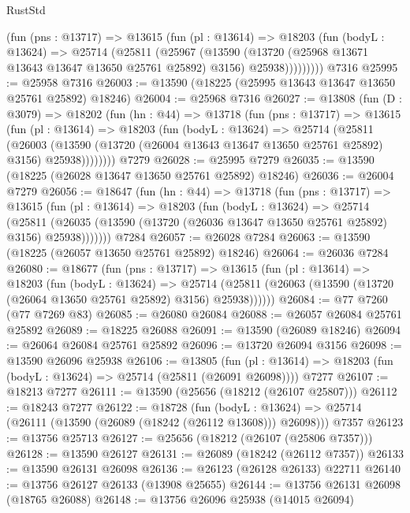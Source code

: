 \begin{lexlean}{RustStd}
\begin{coremodule}
          (fun (pns : @13717) =>
          @13615
            (fun (pl : @13614) =>
            @18203
              (fun (bodyL : @13624) =>
              @25714
                (@25811
                  (@25967
                    (@13590
                      (@13720 (@25968 @13671 @13643 @13647 @13650 @25761 @25892) @3156)
                      @25938)))))))))
    @7316
@25995 := @25958 @7316
@26003 := @13590 (@18225 (@25995 @13643 @13647 @13650 @25761 @25892) @18246)
@26004 := @25968 @7316
@26027 := @13808
    (fun (D : @3079) =>
    @18202
      (fun (hn : @44) =>
      @13718
        (fun (pns : @13717) =>
        @13615
          (fun (pl : @13614) =>
          @18203
            (fun (bodyL : @13624) =>
            @25714
              (@25811
                (@26003
                  (@13590 (@13720 (@26004 @13643 @13647 @13650 @25761 @25892) @3156) @25938))))))))
    @7279
@26028 := @25995 @7279
@26035 := @13590 (@18225 (@26028 @13647 @13650 @25761 @25892) @18246)
@26036 := @26004 @7279
@26056 := @18647
    (fun (hn : @44) =>
    @13718
      (fun (pns : @13717) =>
      @13615
        (fun (pl : @13614) =>
        @18203
          (fun (bodyL : @13624) =>
          @25714
            (@25811
              (@26035 (@13590 (@13720 (@26036 @13647 @13650 @25761 @25892) @3156) @25938)))))))
    @7284
@26057 := @26028 @7284
@26063 := @13590 (@18225 (@26057 @13650 @25761 @25892) @18246)
@26064 := @26036 @7284
@26080 := @18677
    (fun (pns : @13717) =>
    @13615
      (fun (pl : @13614) =>
      @18203
        (fun (bodyL : @13624) =>
        @25714 (@25811 (@26063 (@13590 (@13720 (@26064 @13650 @25761 @25892) @3156) @25938))))))
@26084 := @77 @7260 (@77 @7269 @83)
@26085 := @26080 @26084
@26088 := @26057 @26084 @25761 @25892
@26089 := @18225 @26088
@26091 := @13590 (@26089 @18246)
@26094 := @26064 @26084 @25761 @25892
@26096 := @13720 @26094 @3156
@26098 := @13590 @26096 @25938
@26106 := @13805
    (fun (pl : @13614) => @18203 (fun (bodyL : @13624) => @25714 (@25811 (@26091 @26098))))
    @7277
@26107 := @18213 @7277
@26111 := @13590 (@25656 (@18212 (@26107 @25807)))
@26112 := @18243 @7277
@26122 := @18728
    (fun (bodyL : @13624) => @25714 (@26111 (@13590 (@26089 (@18242 (@26112 @13608))) @26098)))
    @7357
@26123 := @13756 @25713
@26127 := @25656 (@18212 (@26107 (@25806 @7357)))
@26128 := @13590 @26127
@26131 := @26089 (@18242 (@26112 @7357))
@26133 := @13590 @26131 @26098
@26136 := @26123 (@26128 @26133) @22711
@26140 := @13756 @26127 @26133 (@13908 @25655)
@26144 := @13756 @26131 @26098 (@18765 @26088)
@26148 := @13756 @26096 @25938 (@14015 @26094)

\end{coremodule}
\end{lexlean}
